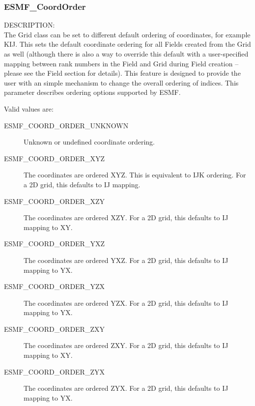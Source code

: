 

 \subsubsection{ESMF\_CoordOrder}

 {\sf DESCRIPTION:\\}
 The Grid class can be set to different default ordering of coordinates, for
 example KIJ.  This sets the default coordinate ordering for all Fields created
 from the Grid as well (although there is also a way to override this default
 with a user-specified mapping between rank numbers in the Field and Grid
 during Field creation -- please see the Field section for details).  This
 feature is designed to provide the user with an simple mechanism to change
 the overall ordering of indices.  This parameter describes ordering options
 supported by ESMF.

 Valid values are:
 \begin{description}
    \item [ESMF\_COORD\_ORDER\_UNKNOWN]
          Unknown or undefined coordinate ordering.

    \item [ESMF\_COORD\_ORDER\_XYZ]
          The coordinates are ordered XYZ.  This is equivalent to IJK ordering.
          For a 2D grid, this defaults to IJ mapping.

    \item [ESMF\_COORD\_ORDER\_XZY]
          The coordinates are ordered XZY.  For a 2D grid, this defaults to IJ 
          mapping to XY.

    \item [ESMF\_COORD\_ORDER\_YXZ]
          The coordinates are ordered YXZ.  For a 2D grid, this defaults to IJ
          mapping to YX.

    \item [ESMF\_COORD\_ORDER\_YZX]
          The coordinates are ordered YZX.  For a 2D grid, this defaults to IJ
          mapping to YX.

    \item [ESMF\_COORD\_ORDER\_ZXY]
          The coordinates are ordered ZXY.  For a 2D grid, this defaults to IJ
          mapping to XY.

    \item [ESMF\_COORD\_ORDER\_ZYX]
          The coordinates are ordered ZYX.  For a 2D grid, this defaults to IJ
          mapping to YX.
 
 \end{description}


